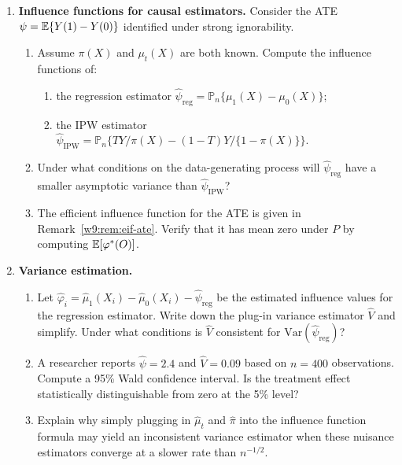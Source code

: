 \documentclass[master.tex]{subfiles}
\begin{document}
\begin{enumerate}
\item \textbf{Influence functions for causal estimators.}
  Consider the ATE $\psi = \mathbb{E}\{Y(1) - Y(0)\}$ identified under
  strong ignorability.
  \begin{enumerate}
    \item Assume $\pi(X)$ and $\mu_t(X)$ are both known.  Compute the
      influence functions of:
      \begin{enumerate}
        \item[(i)] the regression estimator
          $\hat\psi_{\mathrm{reg}} = \mathbb{P}_n\{\mu_1(X) -
          \mu_0(X)\}$;
        \item[(ii)] the IPW estimator
          $\hat\psi_{\mathrm{IPW}} = \mathbb{P}_n\!\bigl\{TY/\pi(X) -
          (1-T)Y/\{1-\pi(X)\}\bigr\}$.
      \end{enumerate}
    \item Under what conditions on the data-generating process will
      $\hat\psi_{\mathrm{reg}}$ have a smaller asymptotic variance
      than $\hat\psi_{\mathrm{IPW}}$?
    \item The efficient influence function for the ATE is given in
      Remark~\ref{w9:rem:eif-ate}.  Verify that it has mean zero
      under $P$ by computing $\mathbb{E}[\varphi^*(O)]$.
  \end{enumerate}

\item \textbf{Variance estimation.}
  \begin{enumerate}
    \item Let $\hat\varphi_i = \hat\mu_1(X_i) - \hat\mu_0(X_i) -
      \hat\psi_{\mathrm{reg}}$ be the estimated influence values for
      the regression estimator.  Write down the plug-in variance
      estimator $\hat V$ and simplify.  Under what conditions is
      $\hat V$ consistent for $\mathrm{Var}(\hat\psi_{\mathrm{reg}})$?
    \item A researcher reports $\hat\psi = 2.4$ and $\hat V = 0.09$
      based on $n = 400$ observations.  Compute a 95\% Wald confidence
      interval.  Is the treatment effect statistically distinguishable
      from zero at the 5\% level?
    \item Explain why simply plugging in $\hat\mu_t$ and $\hat\pi$ into
      the influence function formula may yield an inconsistent variance
      estimator when these nuisance estimators converge at a slower
      rate than $n^{-1/2}$.
  \end{enumerate}


\end{enumerate}
\end{document}
